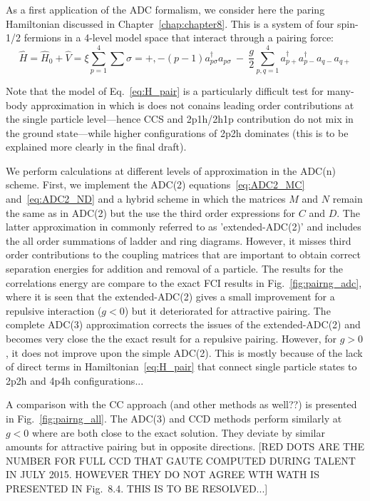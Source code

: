 As a first application of the ADC formalism, we consider here the paring Hamiltonian discussed in Chapter~\ref{chap:chapter8}. This is a system of  four spin-1/2 fermions in a 4-level model space that interact through a pairing force:
  \begin{equation}
   \hat{H} = \hat{H}_0 +  \hat{V} = \xi \sum_{p=1}^4  \sum{\sigma=+, -} (p-1) a^{\dagger}_{p \sigma} a_{p \sigma}
 ~-~ \frac{g}{2} \sum_{p, q=1}^4 a^{\dagger}_{p+}a^{\dagger}_{p-}  a_{q-}a_{q+}
\label{eq:H_pair}
\end{equation}


Note that the model of Eq.~\eqref{eq:H_pair} is a particularly difficult test for many-body approximation in which is does not conains
leading order contributions at the single particle level---hence CCS and 2p1h/2h1p contribution do not mix in the ground state---while 
higher configurations of 2p2h dominates (this is to be explained more clearly in the final draft). 


We perform calculations at different levels of approximation in the ADC(n) scheme. First, we implement the ADC(2) equations~\ref{eq:ADC2_MC} and~\ref{eq:ADC2_ND} and a hybrid scheme in which the matrices $M$ and $N$ remain the same as in ADC(2) but the use the third order  expressions 
for $C$ and $D$. The latter approximation in commonly referred to as 'extended-ADC(2)' and includes the all order summations of ladder and ring diagrams. However, it misses third order contributions to the coupling matrices that are important to obtain correct separation energies  for addition and removal of a particle.  The results for the correlations energy are compare to the exact FCI results in Fig.~\ref{fig:pairng_adc}, where it is seen that the extended-ADC(2)
gives a small improvement for a repulsive  interaction ($g<0$) but it deteriorated for attractive pairing.
The complete ADC(3) approximation corrects the issues of the extended-ADC(2) and becomes very close the the exact result for a repulsive pairing. However, for $g>0$, it does not improve upon the simple ADC(2).  This is mostly because of the lack of direct terms in Hamiltonian~\ref{eq:H_pair} that connect single particle states to 2p2h and 4p4h configurations...



A comparison with the CC approach (and other methods as well??) is presented in Fig.~\ref{fig:pairng_all}.
The ADC(3) and CCD methods perform similarly at $g<0$ where are both close to the exact solution. They deviate by similar amounts for attractive pairing but in opposite directions. {\color{blue} [RED DOTS  ARE THE NUMBER FOR FULL CCD  THAT GAUTE COMPUTED DURING TALENT IN JULY 2015. HOWEVER THEY DO NOT AGREE WTH WATH IS PRESENTED IN Fig.~8.4. THIS IS TO BE RESOLVED...]}

